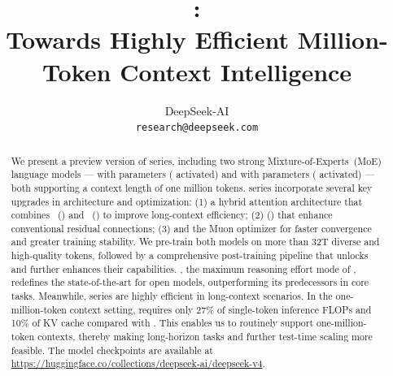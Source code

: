 \title{\centering \dsviv{}: \\ Towards Highly Efficient Million-Token Context Intelligence}

\author[*]{
\vspace{-0.8cm}
DeepSeek-AI
\\
\small
\vspace{-0.3cm}
\texttt{research@deepseek.com}
\vspace{-0.9cm}
}



\newcommand{\fix}{\marginpar{FIX}}
\newcommand{\new}{\marginpar{NEW}}

\newcommand{\zdaxie}[1]{\textcolor[rgb]{0.545,0,0.071}{#1}}

\begin{abstract}
\vspace{-0.5cm}

We present a preview version of \dsviv{} series, including two strong Mixture-of-Experts~(MoE) language models --- \dsvivp{} with \dsvivptp{} parameters (\dsvivpap{} activated) and \dsvivf{} with \dsvivftp{} parameters (\dsvivfap{} activated) --- both supporting a context length of one million tokens.
\dsviv{} series incorporate several key upgrades in architecture and optimization: 
(1) a hybrid attention architecture that combines \csafull{}~(\csa{}) and \hcafull{}~(\hca{}) to improve long-context efficiency; 
(2) \mhcfull{} (\mhc{}) that enhance conventional residual connections;
(3) and the Muon optimizer for faster convergence and greater training stability.
We pre-train both models on more than 32T diverse and high-quality tokens, followed by a comprehensive post-training pipeline that unlocks and further enhances their capabilities.
\dsvivpm{}, the maximum reasoning effort mode of \dsvivp{}, redefines the state-of-the-art for open models, outperforming its predecessors in core tasks.
Meanwhile, \dsviv{} series are highly efficient in long-context scenarios. 
In the one-million-token context setting, \dsvivp{} requires only 27\% of single-token inference FLOPs and 10\% of KV cache compared with \dsviiiII{}. 
This enables us to routinely support one-million-token contexts, thereby making long-horizon tasks and further test-time scaling more feasible.
The model checkpoints are available at \url{https://huggingface.co/collections/deepseek-ai/deepseek-v4}. 

\end{abstract}


